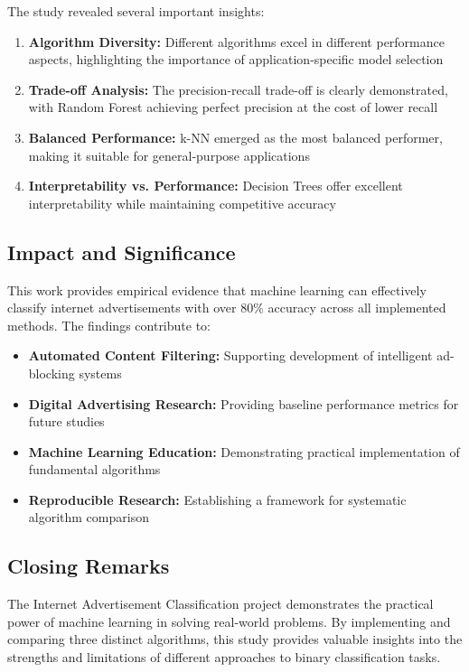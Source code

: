 The study revealed several important insights:

\begin{enumerate}
    \item \textbf{Algorithm Diversity:} Different algorithms excel in different performance aspects, highlighting the importance of application-specific model selection
    
    \item \textbf{Trade-off Analysis:} The precision-recall trade-off is clearly demonstrated, with Random Forest achieving perfect precision at the cost of lower recall
    
    \item \textbf{Balanced Performance:} k-NN emerged as the most balanced performer, making it suitable for general-purpose applications
    
    \item \textbf{Interpretability vs. Performance:} Decision Trees offer excellent interpretability while maintaining competitive accuracy
\end{enumerate}

\subsection{Impact and Significance}

This work provides empirical evidence that machine learning can effectively classify internet advertisements with over 80\% accuracy across all implemented methods. The findings contribute to:

\begin{itemize}
    \item \textbf{Automated Content Filtering:} Supporting development of intelligent ad-blocking systems
    \item \textbf{Digital Advertising Research:} Providing baseline performance metrics for future studies
    \item \textbf{Machine Learning Education:} Demonstrating practical implementation of fundamental algorithms
    \item \textbf{Reproducible Research:} Establishing a framework for systematic algorithm comparison
\end{itemize}

\subsection{Closing Remarks}

The Internet Advertisement Classification project demonstrates the practical power of machine learning in solving real-world problems. By implementing and comparing three distinct algorithms, this study provides valuable insights into the strengths and limitations of different approaches to binary classification tasks.

